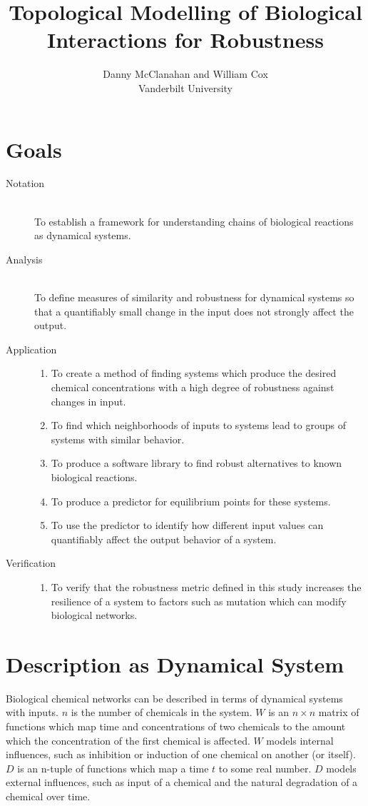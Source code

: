 \documentclass{article}
\title{Topological Modelling of Biological Interactions for Robustness}
\author{Danny McClanahan and William Cox \\
Vanderbilt University}
\date{}
\begin{document}
\maketitle
\vspace{-25pt}

\section{Goals}
\begin{description}
\item[Notation] \hfill \\
  To establish a framework for understanding chains of biological reactions as dynamical systems.
\item[Analysis] \hfill \\
  To define measures of similarity and robustness for dynamical systems so that a quantifiably small change in the input does not strongly affect the output.
\item[Application] \hfill
  \begin{enumerate}
  \item To create a method of finding systems which produce the desired chemical concentrations with a high degree of robustness against changes in input.
  \item To find which neighborhoods of inputs to systems lead to groups of systems with similar behavior.
  \item To produce a software library to find robust alternatives to known biological reactions.
  \item To produce a predictor for equilibrium points for these systems.
  \item To use the predictor to identify how different input values can quantifiably affect the output behavior of a system.
  \end{enumerate}
\item[Verification] \hfill
  \begin{enumerate}
  \item To verify that the robustness metric defined in this study increases the resilience of a system to factors such as mutation which can modify biological networks.
  \end{enumerate}
\end{description}

\section{Description as Dynamical System} \label{description}
Biological chemical networks can be described in terms of dynamical systems with inputs. $n$ is the number of chemicals in the system. $W$ is an $n \times n$ matrix of functions which map time and concentrations of two chemicals to the amount which the concentration of the first chemical is affected. $W$ models internal influences, such as inhibition or induction of one chemical on another (or itself). $D$ is an n-tuple of functions which map a time $t$ to some real number. $D$ models external influences, such as input of a chemical and the natural degradation of a chemical over time.
\end{document}
